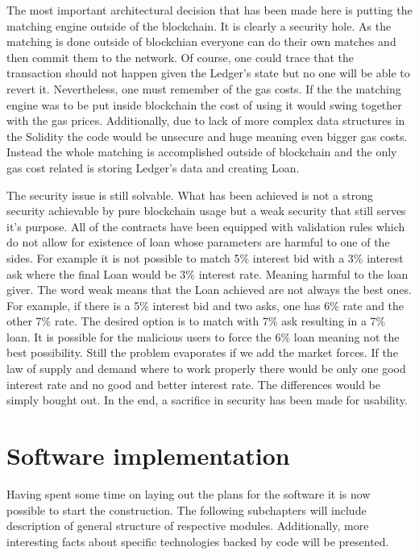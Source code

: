 \documentclass[a4paper,12pt,twoside,openany]{report}
\begin{document}
The most important architectural decision that has been made here is putting the matching engine outside of the blockchain. It is clearly a security hole. As the matching is done outside of blockchian everyone can do their own matches and then commit them to the network. Of course, one could trace that the transaction should not happen given the Ledger's state but no one will be able to revert it. Nevertheless, one must remember of the gas costs. If the the matching engine was to be put inside blockchain the cost of using it would swing together with the gas prices. Additionally, due to lack of more complex data structures in the Solidity the code would be unsecure and huge meaning even bigger gas costs. Instead the whole matching is accomplished outside of blockchain and the only gas cost related is storing Ledger's data and creating Loan. 

The security issue is still solvable. What has been achieved is not a strong security achievable by pure blockchain usage but a weak security that still serves it's purpose. All of the contracts have been equipped with validation rules which do not allow for existence of loan whose parameters are harmful to one of the sides. For example it is not possible to match 5\% interest bid with a 3\% interest ask where the final Loan would be 3\% interest rate. Meaning harmful to the loan giver. The word weak means that the Loan achieved are not always the best ones. For example, if there is a 5\% interest bid and two asks, one has 6\% rate and the other 7\% rate. The desired option is to match with 7\% ask resulting in a 7\% loan. It is possible for the malicious users to force the 6\% loan meaning not the best possibility. Still the problem evaporates if we add the market forces. If the law of supply and demand where to work properly there would be only one good interest rate and no good and better interest rate. The differences would be simply bought out. In the end, a sacrifice in security has been made for usability.

\chapter{Software implementation}

Having spent some time on laying out the plans for the software it is now possible to start the construction. The following subchapters will include description of general structure of respective modules. Additionally, more interesting facts about specific technologies backed by code will be presented.
\end{document}
